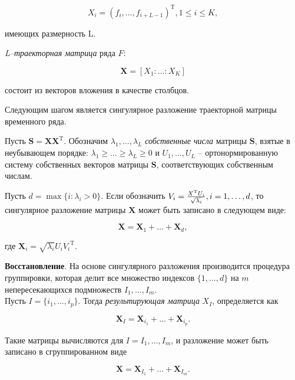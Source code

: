 \documentclass[specialist,
			   substylefile = spbu_report.rtx,
			   subf,href,colorlinks=true, 12pt]{disser}
\begin{document}
\begin{equation*}
	X_i = (f_{i}, \dots, f_{i + L - 1})^\mathrm{T}, 1 \leq i \leq K,
\end{equation*}

имеющих размерность L. 

\textit{L–траекторная матрица} ряда $F$:

\begin{equation*}
	\mathbf{X} = [X_1: \dots: X_K]
\end{equation*}

состоит из векторов вложения в качестве столбцов.

Следующим шагом является сингулярное разложение траекторной матрицы временного ряда.

Пусть $\mathbf{S} = \mathbf{XX}^\mathrm{T}$. Обозначим $\lambda_1, \dots, \lambda_L$ \textit{собственные числа} матрицы $\mathbf{S}$, взятые в неубывающем порядке: $\lambda_1 \geq \dots \geq \lambda_L \geq 0$ и $U_1, \dots, U_L$ – ортонормированную систему собственных векторов матрицы $\mathbf{S}$, соответствующих собственным числам.

Пусть $d = \max\{i: \lambda_i > 0\}$. Если обозначить $V_i = {X^\mathrm{T} U_i \over \sqrt{\lambda_i}}, i = 1, \dots, d$, то сингулярное разложение матрицы $\mathbf{X}$ может быть записано в следующем виде:

\begin{equation*}
	\mathbf{X} = \mathbf{X}_1 + \dots + \mathbf{X}_d,
\end{equation*}

где $\mathbf{X}_i = \sqrt{\lambda_i} U_i {V_i}^\mathrm{T}$.



\textbf{Восстановление}. На основе сингулярного разложения производится процедура группировки, которая делит все множество индексов $\{1, \dots, d\}$ на $m$ непересекающихся подмножеств $I_1, \dots, I_m$.\\

Пусть $I = \{i_1, \dots, i_p\}$. Тогда \textit{результирующая матрица} $X_I$, определяется как

\begin{equation*}
	\mathbf{X}_I = \mathbf{X}_{i_1} + \dots +  \mathbf{X}_{i_p}. 
\end{equation*}

Такие матрицы вычисляются для $I = I_1, \dots, I_m$, и разложение может быть записано в сгруппированном виде

\begin{equation*}
	\mathbf{X} = \mathbf{X}_{I_1} + \dots +  \mathbf{X}_{I_m}. 
\end{equation*}
\end{document}
